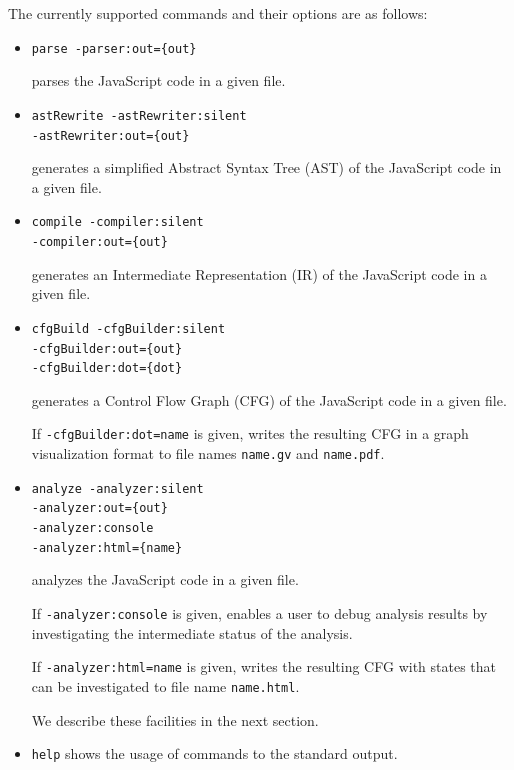 The currently supported commands and their options are as follows:
\begin{itemize}
\item \verb!parse -parser:out={out}!

parses the JavaScript code in a given file.
\item \verb!astRewrite -astRewriter:silent!\\
\hspace*{5.8em}\verb!-astRewriter:out={out}!

generates a simplified Abstract Syntax Tree (AST)
of the  JavaScript code in a given file.
\item \verb!compile -compiler:silent!\\
\hspace*{4.2em}\verb!-compiler:out={out}!

generates an Intermediate Representation (IR)
of the  JavaScript code in a given file.
\item \verb!cfgBuild -cfgBuilder:silent!\\
\hspace*{4.8em}\verb!-cfgBuilder:out={out}!\\
\hspace*{4.8em}\verb!-cfgBuilder:dot={dot}!

generates a Control Flow Graph (CFG) of the  JavaScript code in a given file.

If \verb!-cfgBuilder:dot=name! is given,
\safe writes the resulting CFG in a graph visualization format
to file names \verb!name.gv! and \verb!name.pdf!.

\item \verb!analyze -analyzer:silent!\\
\hspace*{4.4em}\verb!-analyzer:out={out}!\\
\hspace*{4.4em}\verb!-analyzer:console!\\
\hspace*{4.4em}\verb!-analyzer:html={name}!

analyzes the  JavaScript code in a given file.

If \verb!-analyzer:console! is given,
\safe enables a user to debug analysis results by investigating the intermediate
status of the analysis.

If \verb!-analyzer:html=name! is given,
\safe writes the resulting CFG with states that can be investigated to
file name \verb!name.html!.

We describe these facilities in the next section.

\item \verb!help! shows the usage of \safe commands to the standard output.
\end{itemize}

